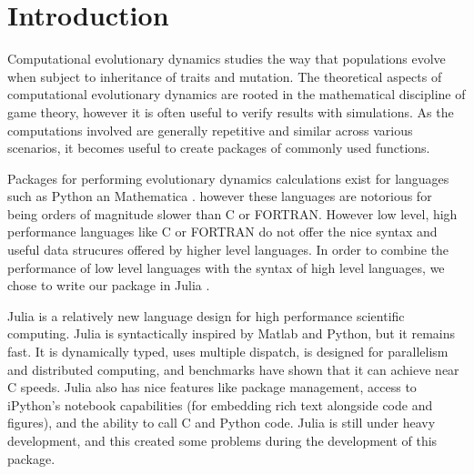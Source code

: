 \section{Introduction}

Computational evolutionary dynamics studies the way that populations evolve when subject to inheritance of traits and mutation.
The theoretical aspects of computational evolutionary dynamics are rooted in the mathematical discipline of game theory, however it is often useful to verify results with simulations.
As the computations involved are generally repetitive and similar across various scenarios, it becomes useful to create packages of commonly used functions.

Packages for performing evolutionary dynamics calculations exist for languages such as Python \cite{pyevodyn} an Mathematica \cite{dynamo}. however these languages are notorious for being orders of magnitude slower than C or FORTRAN.
However low level, high performance languages like C or FORTRAN do not offer the nice syntax and useful data strucures offered by higher level languages.
In order to combine the performance of low level languages with the syntax of high level languages, we chose to write our package in Julia \cite{julia}.

Julia is a relatively new language design for high performance scientific computing.
Julia is syntactically inspired by Matlab and Python, but it remains fast.
It is dynamically typed, uses multiple dispatch, is designed for parallelism and distributed computing, and benchmarks have shown that it can achieve near C speeds.
Julia also has nice features like package management, access to iPython's notebook capabilities (for embedding rich text alongside code and figures), and the ability to call C and Python code.
Julia is still under heavy development, and this created some problems during the development of this package.
